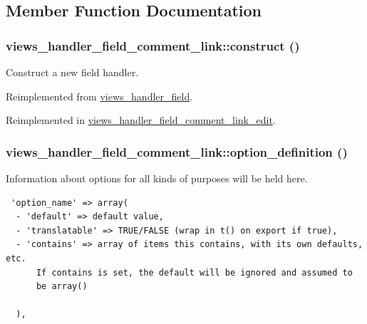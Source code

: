 \subsection{Member Function Documentation}
\hypertarget{classviews__handler__field__comment__link_11c7fcae5ff5f91fa48fc1581115869b}{
\subsubsection[{construct}]{\setlength{\rightskip}{0pt plus 5cm}views\_\-handler\_\-field\_\-comment\_\-link::construct ()}}
\label{classviews__handler__field__comment__link_11c7fcae5ff5f91fa48fc1581115869b}


Construct a new field handler. 

Reimplemented from \hyperlink{classviews__handler__field_3d50050864c255b71c842972a45d39f6}{views\_\-handler\_\-field}.

Reimplemented in \hyperlink{classviews__handler__field__comment__link__edit_b18ca319bec910ab7771786522718d0e}{views\_\-handler\_\-field\_\-comment\_\-link\_\-edit}.\hypertarget{classviews__handler__field__comment__link_9f066947db597494928b57423b1b7d30}{
\subsubsection[{option\_\-definition}]{\setlength{\rightskip}{0pt plus 5cm}views\_\-handler\_\-field\_\-comment\_\-link::option\_\-definition ()}}
\label{classviews__handler__field__comment__link_9f066947db597494928b57423b1b7d30}


Information about options for all kinds of purposes will be held here. 

\begin{Code}\begin{verbatim} 'option_name' => array(
  - 'default' => default value,
  - 'translatable' => TRUE/FALSE (wrap in t() on export if true),
  - 'contains' => array of items this contains, with its own defaults, etc.
      If contains is set, the default will be ignored and assumed to
      be array()

  ),
\end{verbatim}
\end{Code}


